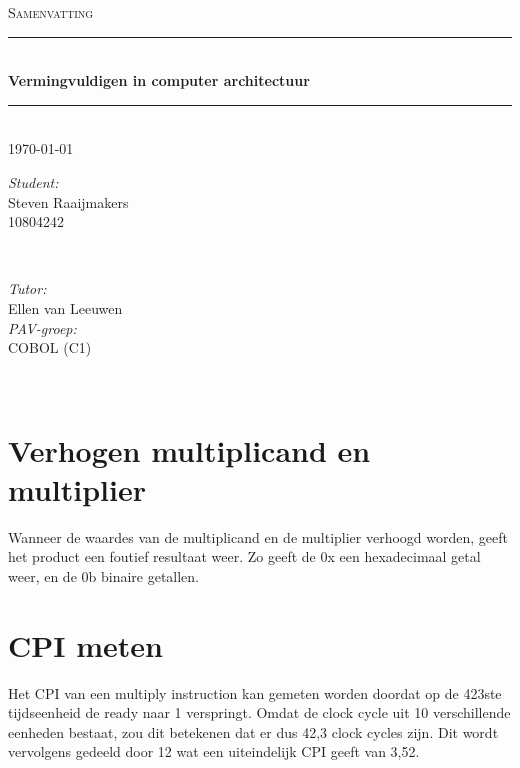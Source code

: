 \documentclass[a4paper,12pt]{article}
\newcommand{\opdracht}{Samenvatting}			%
\newcommand{\titel}{Vermingvuldigen in computer architectuur}	%
\newcommand{\studentA}{Steven Raaijmakers}			%
\newcommand{\uvanetidA}{10804242}
\newcommand{\tutor}{Ellen van Leeuwen}				%
\newcommand{\PAVgroep}{COBOL (C1)}		%
\newcommand{\datum}{\today}					%
\begin{document}
\thispagestyle{firststyle}
\begin{center}
	\textsc{\Large \opdracht}\\[0.2cm]
		\rule{\linewidth}{0.5pt} \\[0.4cm]
			{ \huge \bfseries \titel}
		\rule{\linewidth}{0.5pt} \\[0.2cm]
	{\large \datum  \\[0.4cm]}

	\begin{minipage}{0.4\textwidth}
		\begin{flushleft}
			\emph{Student:}\\
			{\studentA \\ {\small \uvanetidA \\[0.2cm]}}
		\end{flushleft}
	\end{minipage}
~
	\begin{minipage}{0.4\textwidth}
		\begin{flushright}
			\emph{Tutor:} \\
			\tutor \\[0.2cm]
			\emph{PAV-groep:} \\
			\PAVgroep \\[0.2cm]
		\end{flushright}
	\end{minipage}\\[1 cm]
\end{center}


\section{Verhogen multiplicand en multiplier}

Wanneer de waardes van de multiplicand en de multiplier verhoogd worden, geeft het product een foutief resultaat weer. Zo geeft de 0x een 
hexadecimaal getal weer, en de 0b binaire getallen. 

\section{CPI meten}
Het CPI van een multiply instruction kan gemeten worden doordat op de 423ste tijdseenheid de ready naar 1 verspringt. Omdat de clock cycle uit 10 verschillende 
eenheden bestaat, zou dit betekenen dat er dus 42,3 clock cycles zijn. Dit wordt vervolgens gedeeld door 12 wat een uiteindelijk CPI geeft van 3,52. 
\end{document}
